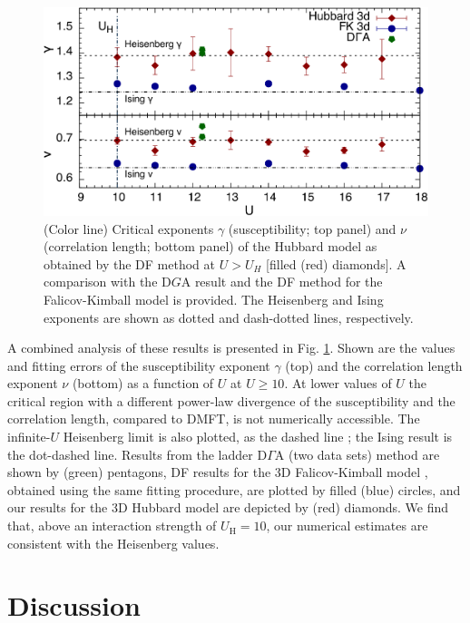 \documentclass[aps,prb,twocolumn,amsmath,notitlepage,floatfix,footinbib,superscriptaddress,showpacs, showkeys]{revtex4-1}
\begin{document}
\begin{figure}[t]
\begin{center}
\includegraphics[width=\columnwidth]{fig6.pdf}\end{center}\vspace*{-1.5em}
\caption{(Color line) Critical exponents $\gamma$ (susceptibility; top panel) and $\nu$ (correlation length; bottom panel) of the Hubbard model as obtained by the DF method at $U>U_H$ [filled (red) diamonds]. 
A comparison with the D$G$A result \cite{Rohringer2011} and the DF method for the Falicov-Kimball model \cite{Antipov2014} is provided. 
The Heisenberg and Ising exponents are shown as dotted and dash-dotted lines, respectively.}
\label{fig:exponents}
\end{figure}

A combined analysis of these results is presented in Fig. \ref{fig:exponents}. 
Shown are the values and fitting errors of the susceptibility exponent $\gamma$ (top) and the correlation length exponent $\nu$ (bottom) as a function of $U$ at $U \geq 10$. 
At lower values of $U$ the critical region with a different power-law divergence of the susceptibility and the correlation length, compared to DMFT, is not numerically accessible. 
The infinite-$U$ Heisenberg limit is also plotted, as the dashed line \cite{Holm1993}; the Ising result is the dot-dashed line. Results from the ladder D$\Gamma$A (two data sets) method \cite{Rohringer2011} are shown by (green) pentagons, DF results for the 3D Falicov-Kimball model \cite{Antipov2014}, obtained using the same fitting procedure, are plotted by filled (blue) circles, and our results for the 3D Hubbard model are depicted by (red) diamonds.
We find that, above an interaction strength of $U_\text{H} = 10$, our numerical estimates are consistent with the Heisenberg values. 

\section{Discussion}
\end{document}
